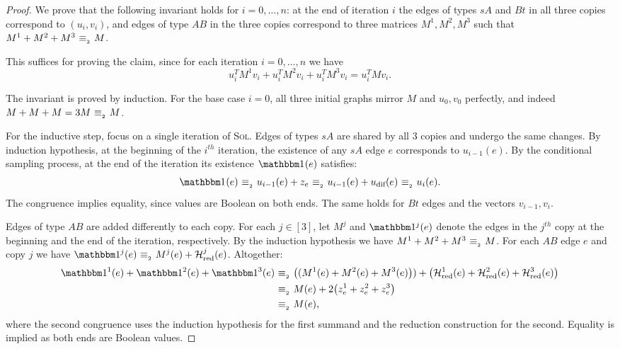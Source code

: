 \documentclass[letter,11pt]{article}
\newcommand{\sol}{\textsc{Sol}\xspace}
\newcommand{\redhist}{\mathcal{H}_\textnormal{red}}
\newcommand{\udif}{{u_\textnormal{dif}}}
\begin{document}
\begin{proof}
    We prove that the following invariant holds for $i=0, \dots, n$: at the end of iteration $i$ the edges of types $sA$ and $Bt$ in all three copies correspond to $(u_i, v_i)$, and edges of type $AB$ in the three copies correspond to three matrices $M^1, M^2, M^3$ such that $M^1 + M^2 + M^3 \ {\equiv_{_{2}}}\  M$.
    
    This suffices for proving the claim, since for each iteration $i = 0, \dots, n$ we have
    \[
        u_i^T M^1 v_i + u_i^T M^2 v_i + u_i^T M^3 v_i = u_i^T M v_i .
    \]
        
    The invariant is proved by induction.
    For the base case $i=0$, all three initial graphs mirror $M$ and $u_0, v_0$ perfectly, and indeed $M + M + M = 3M \ {\equiv_{_{2}}}\  M$. 
    
    For the inductive step, focus on a single iteration of \sol. 
    Edges of types $sA$ are shared by all $3$ copies and undergo the same changes.
    By induction hypothesis, at the beginning of the $i^{th}$ iteration, the existence of any $sA$ edge $e$ corresponds to $u_{i-1}(e)$. By the conditional sampling process, at the end of the iteration its existence $\ind{}(e)$ satisfies:
    \[
\begin{aligned}
        \ind{}(e)
       \sameparity u_{i-1}(e) + z_e
       \sameparity u_{i-1}(e) + \udif(e) \sameparity u_i(e) . 
    \end{aligned}
\]
    The congruence implies equality, since values are Boolean on both ends.
    The same holds for $Bt$ edges and the vectors $v_{i-1}, v_i$.
    
    Edges of type $AB$ are added differently to each copy. 
    For each $j\in[3]$, let $M^j$ and $\ind{}^j(e)$ denote the edges in the $j^{th}$ copy at the beginning and the end of the iteration, respectively.
    By the induction hypothesis we have $M^1 + M^2 + M^3 \ {\equiv_{_{2}}}\  M$.
    For each $AB$ edge $e$ and copy $j$ we have $\ind{}^j(e) \sameparity M^j(e) + \redhist^j(e)$. Altogether:
    \[
        \begin{aligned}
            \ind{}^1(e) + \ind{}^2(e) + \ind{}^3(e)
            &\sameparity \left((M^1(e) + M^2(e) + M^3(e)\right)) + \left(\redhist^1(e) + \redhist^2(e) + \redhist^3(e)\right)\\
            &\sameparity M(e) + 2\left(z_e^1 + z_e^2 + z_e^3\right)\\
            &\sameparity M(e) ,
        \end{aligned}
    \]
    where the second congruence uses the induction hypothesis for the first summand and the reduction construction for the second. 
    Equality is implied as both ends are Boolean values. 
\end{proof}
\end{document}

